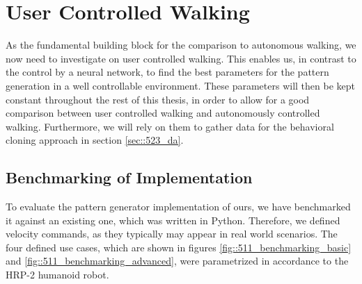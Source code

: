 \section{User Controlled Walking}
\label{sec::51_uc}
As the fundamental building block for the comparison to autonomous walking, we now need to investigate on user controlled walking. This enables us, in contrast to the control by a neural network, to find the best parameters for the pattern generation in a well controllable environment. These parameters will then be kept constant throughout the rest of this thesis, in order to allow for a good comparison between user controlled walking and autonomously controlled walking. Furthermore, we will rely on them to gather data for the behavioral cloning approach in section \ref{sec::523_da}.
\subsection{Benchmarking of Implementation}
To evaluate the pattern generator implementation of ours, we have benchmarked it against an existing one, which was written in Python. Therefore, we defined velocity commands, as they typically may appear in real world scenarios. The four defined use cases, which are shown in figures \ref{fig::511_benchmarking_basic} and \ref{fig::511_benchmarking_advanced}, were parametrized in accordance to the HRP-2 humanoid robot.
